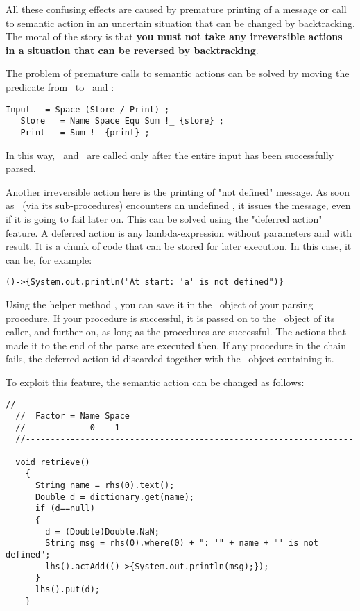 All these confusing effects are caused by premature printing of a message
or call to semantic action in an uncertain situation that can be changed by backtracking.
%
The moral of the story is that \textbf{you must not take any irreversible actions
in a situation that can be reversed by backtracking}.

The problem of premature calls to semantic actions 
can be solved by moving the predicate  from \Input\ 
to \Store\ and \Print:

\small
\begin{Verbatim}[frame=single,framesep=2mm,samepage=true,xleftmargin=15mm,xrightmargin=15mm,baselinestretch=0.8]
   Input   = Space (Store / Print) ;
   Store   = Name Space Equ Sum !_ {store} ;
   Print   = Sum !_ {print} ;
\end{Verbatim}
\normalsize

In this way, \Storea\ and \Printa\ are called only after the entire input
has been successfully parsed.

Another irreversible action here is the printing of "not defined" message.
As soon as \Print\ (via its sub-procedures) encounters an undefined ,
it issues the message, even if it is going to fail later on.
This can be solved using the "deferred action" feature.
A deferred action is any lambda-expression without parameters and with  result.
It  is a chunk of code that can be stored for later execution.
In this case, it can be, for example: 

\small
\begin{Verbatim}[frame=single,framesep=2mm,samepage=true,xleftmargin=15mm,xrightmargin=15mm,baselinestretch=0.8]
   ()->{System.out.println("At start: 'a' is not defined")}
\end{Verbatim}
\normalsize

Using the helper method , you can save it in the \Phrase\ object of your parsing procedure.
If your procedure is successful, it is passed on to the \Phrase\ object of its caller, and further on,
as long as the procedures are successful.
The actions that made it to the end of the parse are executed then.
If any procedure in the chain fails, the deferred action id discarded together with the \Phrase\ 
object containing it.

To exploit this feature, the semantic action  can be changed as follows:

\small
\begin{Verbatim}[frame=single,framesep=2mm,samepage=true,xleftmargin=15mm,xrightmargin=15mm,baselinestretch=0.8]
  //-------------------------------------------------------------------
  //  Factor = Name Space
  //             0    1
  //-------------------------------------------------------------------
  void retrieve()
    {
      String name = rhs(0).text();
      Double d = dictionary.get(name);
      if (d==null)
      {
        d = (Double)Double.NaN;
        String msg = rhs(0).where(0) + ": '" + name + "' is not defined";
        lhs().actAdd(()->{System.out.println(msg);});
      }
      lhs().put(d);
    }
\end{Verbatim}
\normalsize

